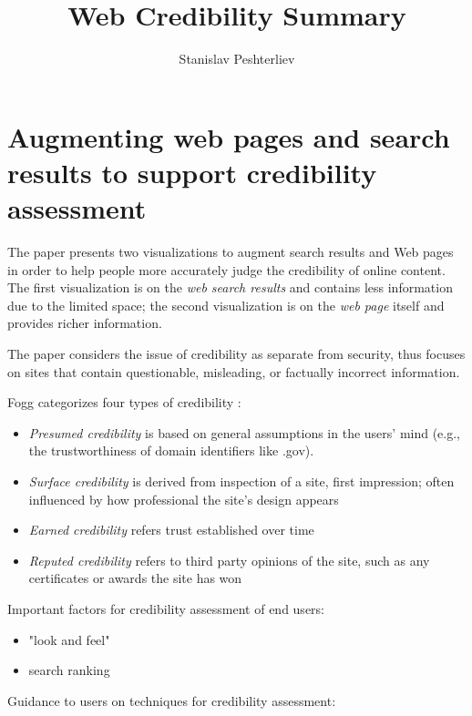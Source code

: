 \documentclass{article}
\author{Stanislav Peshterliev}
\title{Web Credibility Summary}
\begin{document}
\maketitle

\section{Augmenting web pages and search results to support credibility assessment \cite{conf/chi/SchwarzM11}}

The paper presents two visualizations to augment search results and Web pages in order to help people more accurately judge the credibility of online content. The first visualization is on the \textit{web search results} and contains less information due to the limited space; the second visualization is on the \textit{web page} itself and provides richer information.

The paper considers the issue of credibility as separate from security, thus focuses on sites that contain questionable, misleading, or factually incorrect information.

Fogg categorizes four types of credibility \cite{Fogg:2002:PTU:764008.763957}:
\begin{itemize}
\item \textit{Presumed credibility} is based on general assumptions in
the users’ mind (e.g., the trustworthiness of domain
identifiers like .gov).

\item \textit{Surface credibility} is derived from inspection of a site, first impression; often influenced by how professional the site's design appears

\item \textit{Earned credibility} refers trust established over time

\item \textit{Reputed credibility} refers to third party opinions of the site, such as any certificates or awards the site has won
\end{itemize}

Important factors for credibility assessment of end users:

\begin{itemize}
\item "look and feel"
\item  search ranking
\end{itemize}

Guidance to users on techniques for credibility assessment: 
\end{document}
